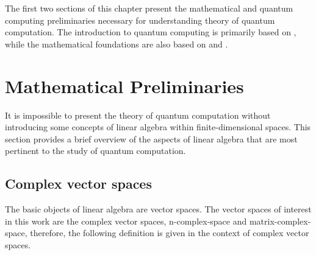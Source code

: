 The first two sections of this chapter present the mathematical and quantum computing preliminaries necessary for understanding theory of quantum computation. The introduction to quantum computing is primarily based on \cite{nielsen2010quantum,watrous2018theory}, while the mathematical foundations are also based on \cite{rudin91functional} and  \cite{guide2006infinite} .

\section{Mathematical Preliminaries} \label{sec:Math}


It is impossible to present the theory of quantum computation without introducing some concepts of linear algebra within finite-dimensional spaces. This section provides a brief overview of the aspects of linear algebra that are most pertinent to the study of quantum computation. 

\subsection{Complex vector spaces}

The basic objects of linear algebra are vector spaces. The vector spaces of interest in this work are the complex vector spaces, \gls{n-complex-space} and \gls{matrix-complex-space}, therefore, the following definition is given in the context of complex vector spaces. 

